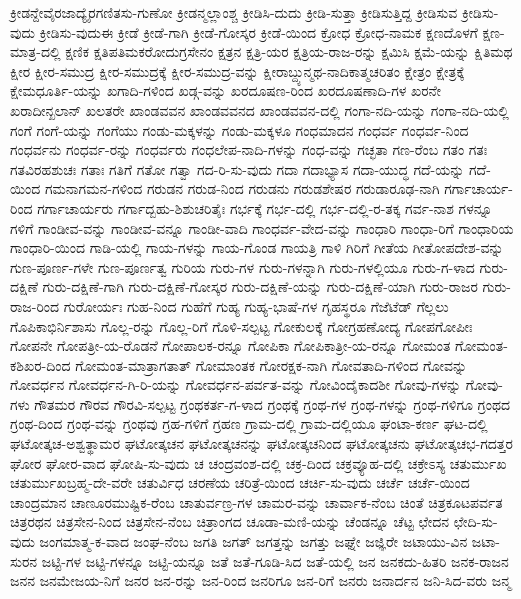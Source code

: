 {ಕ್ರೀಡನ್ದೇವೈರಜಾದ್ಯೈರಗಣಿತಸು-ಗುಣೋ
ಕ್ರೀಡನ್ಮಲ್ಲಾಂಶ್ಚ
ಕ್ರೀಡಿಸಿ-ದುದು
ಕ್ರೀಡಿ-ಸುತ್ತಾ
ಕ್ರೀಡಿಸುತ್ತಿದ್ದ
ಕ್ರೀಡಿಸುವ
ಕ್ರೀಡಿಸು-ವುದು
ಕ್ರೀಡಿಸು-ವುದುಈ
ಕ್ರೀಡೆ
ಕ್ರೀಡೆ-ಗಾಗಿ
ಕ್ರೀಡೆ-ಗೋಸ್ಕರ
ಕ್ರೀಡೆ-ಯಿಂದ
ಕ್ರೋಧ
ಕ್ರೋಧ-ನಾಮಕ
ಕ್ಷಣದೊಳಗೆ
ಕ್ಷಣ-ಮಾತ್ರ-ದಲ್ಲಿ
ಕ್ಷಣಿಕ
ಕ್ಷತಿಪತಿಮಕರೋದುಗ್ರಸೇನಂ
ಕ್ಷತ್ರನ
ಕ್ಷತ್ರಿ-ಯರ
ಕ್ಷತ್ರಿಯ-ರಾಜ-ರನ್ನು
ಕ್ಷಮಿಸಿ
ಕ್ಷಮೆ-ಯನ್ನು
ಕ್ಷಿತಿಮಥ
ಕ್ಷೀರ
ಕ್ಷೀರ-ಸಮುದ್ರ
ಕ್ಷೀರ-ಸಮುದ್ರಕ್ಕೆ
ಕ್ಷೀರ-ಸಮುದ್ರ-ವನ್ನು
ಕ್ಷೀರಾಬ್ದ್ಯುನ್ಮಥ-ನಾದಿಕಾತ್ಮಚರಿತಂ
ಕ್ಷೇತ್ರಂ
ಕ್ಷೇತ್ರಕ್ಕೆ
ಕ್ಷೇಮಧೂರ್ತಿ-ಯನ್ನು
ಖಗಾದಿ-ಗಳಿಂದ
ಖಡ್ಗ-ವನ್ನು
ಖರದೂಷಣ-ರಿಂದ
ಖರದೂಷಣಾದಿ-ಗಳ
ಖರನೇ
ಖರಾದೀನ್ಖಲಾನ್
ಖಲತರೇ
ಖಾಂಡವವನ
ಖಾಂಡವವನದ
ಖಾಂಡವವನ-ದಲ್ಲಿ
ಗಂಗಾ-ನದಿ-ಯನ್ನು
ಗಂಗಾ-ನದಿ-ಯಲ್ಲಿ
ಗಂಗೆ
ಗಂಗೆ-ಯನ್ನು
ಗಂಗೆಯು
ಗಂಡು-ಮಕ್ಕಳನ್ನು
ಗಂಡು-ಮಕ್ಕಳೂ
ಗಂಧಮಾದನ
ಗಂಧರ್ವ
ಗಂಧರ್ವ-ನಿಂದ
ಗಂಧರ್ವನು
ಗಂಧರ್ವ-ರನ್ನು
ಗಂಧರ್ವರು
ಗಂಧಲೇಪ-ನಾದಿ-ಗಳನ್ನು
ಗಂಧ-ವನ್ನು
ಗಚ್ಛತಾ
ಗಣ-ರೆಂಬ
ಗತಂ
ಗತಃ
ಗತವಿರಹಶುಚಃ
ಗತಾಃ
ಗತಿಗೆ
ಗತೋ
ಗತ್ವಾ
ಗದ-ರಿ-ಸು-ವುದು
ಗದಾ
ಗದಾಭ್ಯಾಸ
ಗದಾ-ಯುದ್ಧ
ಗದೆ-ಯನ್ನು
ಗದೆ-ಯಿಂದ
ಗಮನಾಗಮನ-ಗಳಿಂದ
ಗರುಡನ
ಗರುಡ-ನಿಂದ
ಗರುಡನು
ಗರುಡಶೇಷರ
ಗರುಡಾರೂಢ-ನಾಗಿ
ಗರ್ಗಾಚಾರ್ಯ-ರಿಂದ
ಗರ್ಗಾಚಾರ್ಯರು
ಗರ್ಗಾದ್ಬಹು-ಶಿಶುಚರಿತೈಃ
ಗರ್ಭಕ್ಕೆ
ಗರ್ಭ-ದಲ್ಲಿ
ಗರ್ಭ-ದಲ್ಲಿ-ರ-ತಕ್ಕ
ಗರ್ವ-ನಾಶ
ಗಳನ್ನೂ
ಗಳಿಗೆ
ಗಾಂಡೀವ-ವನ್ನು
ಗಾಂಡೀವ-ವನ್ನೂ
ಗಾಂಡೀ-ವಾದಿ
ಗಾಂಧರ್ವ-ವೇದ-ವನ್ನು
ಗಾಂಧಾರಿ
ಗಾಂಧಾ-ರಿಗೆ
ಗಾಂಧಾರಿಯ
ಗಾಂಧಾರಿ-ಯಿಂದ
ಗಾಡಿ-ಯಲ್ಲಿ
ಗಾಯ-ಗಳನ್ನು
ಗಾಯ-ಗೊಂಡ
ಗಾಯತ್ರಿ
ಗಾಳಿ
ಗಿರಿಗೆ
ಗೀತೆಯ
ಗೀತೋಪದೇಶ-ವನ್ನು
ಗುಣ-ಪೂರ್ಣ-ಗಳೇ
ಗುಣ-ಪೂರ್ಣತ್ವ
ಗುರಿಯ
ಗುರು-ಗಳ
ಗುರು-ಗಳನ್ನಾಗಿ
ಗುರು-ಗಳಲ್ಲಿಯೂ
ಗುರು-ಗ-ಳಾದ
ಗುರು-ದಕ್ಷಿಣೆ
ಗುರು-ದಕ್ಷಿಣೆ-ಗಾಗಿ
ಗುರು-ದಕ್ಷಿಣೆ-ಗೋಸ್ಕರ
ಗುರು-ದಕ್ಷಿಣೆ-ಯನ್ನು
ಗುರು-ದಕ್ಷಿಣೆ-ಯಾಗಿ
ಗುರು-ರಾಜರ
ಗುರು-ರಾಜ-ರಿಂದ
ಗುರೋರ್ಯಃ
ಗುಹ-ನಿಂದ
ಗುಹೆಗೆ
ಗುಹ್ಯ
ಗುಹ್ಯ-ಭಾಷೆ-ಗಳ
ಗೃಹಸ್ಥರೂ
ಗೆಜೆಟೆಡ್
ಗೆಲ್ಲಲು
ಗೊಪಿಕಾಭಿರ್ನಿಶಾಸು
ಗೊಲ್ಲ-ರನ್ನು
ಗೊಲ್ಲ-ರಿಗೆ
ಗೊಳಿ-ಸಲ್ಪಟ್ಟ
ಗೋಕುಲಕ್ಕೆ
ಗೋಗ್ರಹಣೋದ್ಯ
ಗೋಪಗೋಪೀಃ
ಗೋಪನೇ
ಗೋಪತ್ರೀ-ಯ-ರೊಡನೆ
ಗೋಪಾಲಕ-ರನ್ನೂ
ಗೋಪಿಕಾ
ಗೋಪಿಕಾತ್ರೀ-ಯ-ರನ್ನೂ
ಗೋಮಂತ
ಗೋಮಂತ-ಕಶಿಖರ-ದಿಂದ
ಗೋಮಂತ-ಮಾತ್ರಾಗತಾತ್
ಗೋಮಾಂತಕ
ಗೋರಕ್ಷಕ-ನಾಗಿ
ಗೋವತಾದಿ-ಗಳಿಂದ
ಗೋವನ್ನು
ಗೋವರ್ಧನ
ಗೋವರ್ಧನ-ಗಿ-ರಿ-ಯನ್ನು
ಗೋವರ್ಧನ-ಪರ್ವತ-ವನ್ನು
ಗೋವಿಂದೈಕಾದಶೀ
ಗೋವು-ಗಳನ್ನು
ಗೋವು-ಗಳು
ಗೌತಮರ
ಗೌರವ
ಗೌರವಿ-ಸಲ್ಪಟ್ಟ
ಗ್ರಂಥಕರ್ತ-ಗ-ಳಾದ
ಗ್ರಂಥಕ್ಕೆ
ಗ್ರಂಥ-ಗಳ
ಗ್ರಂಥ-ಗಳನ್ನು
ಗ್ರಂಥ-ಗಳಿಗೂ
ಗ್ರಂಥದ
ಗ್ರಂಥ-ದಿಂದ
ಗ್ರಂಥ-ವನ್ನು
ಗ್ರಂಥವು
ಗ್ರಹ-ಗಳಿಗೆ
ಗ್ರಹಣ
ಗ್ರಾಮ-ದಲ್ಲಿ
ಗ್ರಾಮ-ದಲ್ಲಿಯೂ
ಘಂಟಾ-ಕರ್ಣ
ಘಟ-ದಲ್ಲಿ
ಘಟೋತ್ಕಚ-ಅಶ್ವತ್ಥಾಮರ
ಘಟೋತ್ಕಚನ
ಘಟೋತ್ಕಚನನ್ನು
ಘಟೋತ್ಕಚನಿಂದ
ಘಟೋತ್ಕಚನು
ಘಟೋತ್ಕಚಭ-ಗದತ್ತರ
ಘೋರ
ಘೋರ-ವಾದ
ಘೋಷಿ-ಸು-ವುದು
ಚ
ಚಂದ್ರವಂಶ-ದಲ್ಲಿ
ಚಕ್ರ-ದಿಂದ
ಚಕ್ರವ್ಯೂಹ-ದಲ್ಲಿ
ಚಕ್ರೇಽಸ್ಯ
ಚತುರ್ಮುಖ
ಚತುರ್ಮುಖಬ್ರಹ್ಮ-ದೇ-ವರೇ
ಚತುರ್ವಿಧ
ಚರಣೆಯ
ಚರಿತ್ರೆ-ಯಿಂದ
ಚರ್ಚಿ-ಸು-ವುದು
ಚರ್ಚೆ
ಚರ್ಚೆ-ಯಿಂದ
ಚಾಂದ್ರಮಾನ
ಚಾಣೂರಮುಷ್ಟಿಕ-ರೆಂಬ
ಚಾತುರ್ವಣ್ರ-ಗಳ
ಚಾಮರ-ವನ್ನು
ಚಾರ್ವಾಕ-ನೆಂಬ
ಚಿಂತೆ
ಚಿತ್ರಕೂಟಪರ್ವತ
ಚಿತ್ರರಥನ
ಚಿತ್ರಸೇನ-ನಿಂದ
ಚಿತ್ರಸೇನ-ನೆಂಬ
ಚಿತ್ರಾಂಗದ
ಚೂಡಾ-ಮಣಿ-ಯನ್ನು
ಚೆಂಡನ್ನೂ
ಚೆಟ್ಟ
ಛೇದನ
ಛೇದಿ-ಸು-ವುದು
ಜಂಗಮಾತ್ಮ-ಕ-ವಾದ
ಜಂಘ-ನೆಂಬ
ಜಗತಿ
ಜಗತ್
ಜಗತ್ತನ್ನು
ಜಗತ್ತು
ಜಘ್ನೇ
ಜಜ್ಞಿರೇ
ಜಟಾಯು-ವಿನ
ಜಟಾ-ಸುರನ
ಜಟ್ಟಿ-ಗಳ
ಜಟ್ಟಿ-ಗಳನ್ನೂ
ಜಟ್ಟಿ-ಯನ್ನೂ
ಜತೆ
ಜತೆ-ಗೂಡಿ-ಸಿದ
ಜತೆ-ಯಲ್ಲಿ
ಜನ
ಜನಕದು-ಹಿತರಿ
ಜನಕ-ರಾಜನ
ಜನನ
ಜನಮೇಜಯ-ನಿಗೆ
ಜನರ
ಜನ-ರನ್ನು
ಜನ-ರಿಂದ
ಜನರಿಗೂ
ಜನ-ರಿಗೆ
ಜನರು
ಜನಾರ್ದನ
ಜನಿ-ಸಿದ-ವರು
ಜನ್ಮ
}
